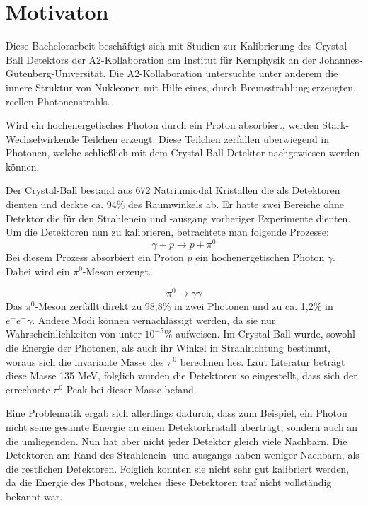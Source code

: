 \documentclass[a4paper,11pt,oneside,final,german,openbib,pdftex]{scrbook}
\begin{document}
\section{Motivaton}
{
	Diese Bachelorarbeit beschäftigt sich mit Studien zur Kalibrierung des Crystal-Ball Detektors der A2-Kollaboration am Institut für Kernphysik an der Johannes-Gutenberg-Universität.
	Die A2-Kollaboration untersuchte unter anderem die innere Struktur von Nukleonen mit Hilfe eines, durch Bremsstrahlung erzeugten, reellen Photonenstrahls. 
	
	Wird ein hochenergetisches Photon durch ein Proton absorbiert, werden Stark-Wechselwirkende Teilchen erzeugt. Diese Teilchen zerfallen überwiegend in Photonen, welche schließlich mit dem Crystal-Ball Detektor nachgewiesen werden können. 
	
	Der Crystal-Ball bestand aus 672 Natriumiodid Kristallen die als Detektoren dienten und deckte ca. 94\% des Raumwinkels ab.
	Er hatte zwei Bereiche ohne Detektor die für den Strahlenein und -ausgang vorheriger Experimente dienten.
	Um die Detektoren nun zu kalibrieren, betrachtete man folgende Prozesse:
\begin{equation}
	\gamma + p \rightarrow p + \pi^0
	\label{eq.gammascattering}
\end{equation} 
Bei diesem Prozess absorbiert ein Proton $p$ ein hochenergetischen Photon $\gamma$. Dabei wird ein $\pi^0$-Meson erzeugt.

	\begin{equation}
		\pi^0\rightarrow \gamma \gamma
		\label{eq.pi0decay}
	\end{equation}
	Das $\pi^0$-Meson zerfällt direkt zu 98,8\% in zwei Photonen und zu ca. 1,2\% in $e^+e^- \gamma$. Andere Modi können vernachlässigt werden, da sie nur Wahrscheinlichkeiten von unter $10^{-5}$\% aufweisen. Im Crystal-Ball wurde, sowohl die Energie der Photonen, als auch ihr Winkel in Strahlrichtung bestimmt, woraus sich die invariante Masse des $\pi^0$ berechnen lies.
	Laut Literatur betr\"agt diese Masse 135 MeV, folglich wurden die Detektoren so eingestellt, dass sich der errechnete $\pi^0$-Peak bei dieser Masse befand. 
		
	Eine Problematik ergab sich allerdings dadurch, dass zum Beispiel, ein Photon nicht seine gesamte Energie an einen Detektorkristall überträgt, sondern auch an die umliegenden. Nun hat aber nicht jeder Detektor gleich viele Nachbarn. Die Detektoren am Rand des Strahlenein- und ausgangs haben weniger Nachbarn, als die restlichen Detektoren. Folglich konnten sie nicht sehr gut kalibriert werden, da die Energie des Photons, welches diese Detektoren traf nicht vollständig bekannt war.
	
}
\end{document}
